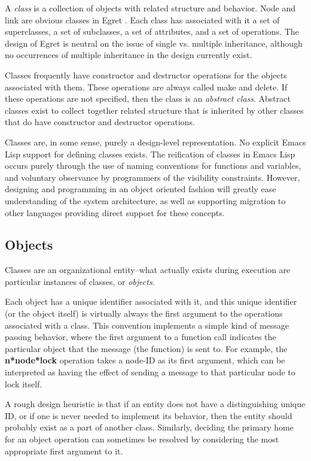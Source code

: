 A {\em class}\/ is a collection of objects with related structure and
behavior.  {\sf Node} and {\sf link} are obvious classes in Egret . Each class
has associated with it a set of superclasses, a set of subclasses, a set of
attributes, and a set of operations.  The design of Egret  is  neutral on the
issue of single vs.  multiple inheritance, although no occurrences of multiple
inheritance in the design currently exist.

Classes frequently have constructor and destructor operations for the objects
associated with them.  These operations are always called {\sf make}
and {\sf delete}. If these operations are not specified, then the class is an 
{\em abstract class}. Abstract classes exist to collect together related
structure that is inherited by other classes that do have constructor
and destructor operations.  

Classes are, in some sense, purely a design-level representation. No explicit
Emacs Lisp support for defining classes exists.  The reification of classes in
Emacs Lisp occurs purely through the use of naming conventions for functions
and variables, and voluntary observance by programmers of the visibility
constraints.  However, designing and  programming in an object oriented
fashion will greatly ease understanding of the system architecture, as well as
supporting migration to other languages providing direct support for these
concepts.

\subsection{Objects} 

Classes are an organizational entity--what actually exists during
execution are particular instances of classes, or {\em objects}.

Each object has a unique identifier associated with it, and this unique
identifier (or the object itself) is virtually always the first argument to the
operations associated with a class.  This convention implements a simple kind
of message passing behavior, where the first argument to a function call
indicates the particular object that the message (the function) is sent to.  For
example, the {\bf n*node*lock} operation takes a node-ID as its
first argument, which can be interpreted as having the effect of sending a
message to that particular node to lock itself.

A rough design heuristic is that if an entity does not have a distinguishing
unique ID, or if one is never needed to implement its behavior, then the entity
should probably exist as a part of another class.  Similarly, deciding the
primary home for an object operation can sometimes be resolved by
considering the most appropriate first argument to it.

